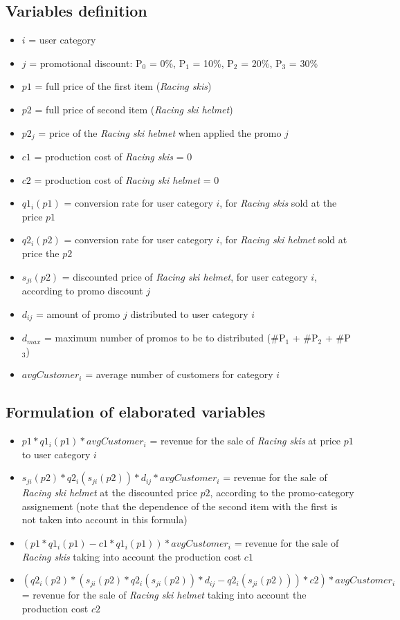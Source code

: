\subsection*{Variables definition}
\begin{itemize}
\item $i$ = user category 
\item $j$ = promotional discount: P$_0$ = 0\%, P$_1$ = 10\%, P$_2$ = 20\%, P$_3$ = 30\%
\item $p1$ = full price of the first item (\textit{Racing skis}) 
\item $p2$ = full price of second item (\textit{Racing ski helmet})
\item $p2_j$ = price of the \textit{Racing ski helmet} when applied the promo $j$
\item $c1$ = production cost of \textit{Racing skis} = 0
\item $c2$ = production cost of \textit{Racing ski helmet} = 0
\item $q1_i(p1)$ = conversion rate for user category $i$, for \textit{Racing skis} sold at the price $p1$
\item $q2_i(p2)$ = conversion rate for user category $i$, for \textit{Racing ski helmet} sold at price the $p2$
\item $s_{ji}(p2)$ = discounted price of \textit{Racing ski helmet}, for user category $i$, according to promo discount $j$
\item $d_{ij}$ = amount of promo $j$ distributed to user category $i$
\item $d_{max}$ = maximum number of promos to be to distributed (\#P$_1$ + \#P$_2$ + \#P$_3$)
\item $avgCustomer_i$ = average number of customers for category $i$
\end{itemize}


\subsection*{Formulation of elaborated variables}
\begin{itemize}
\item $p1*q1_i(p1)*avgCustomer_i$ = revenue for the sale of \textit{Racing skis} at price $p1$ to user category $i$ 
\item $s_{ji}(p2)*q2_i(s_{ji}(p2))*d_{ij}*avgCustomer_i$  = revenue for the sale of \textit{Racing ski helmet} at the discounted price $p2$, according to the promo-category assignement (note that the dependence of the second item with the first is not taken into account in this formula)
\item $(p1*q1_i(p1)-c1*q1_i(p1))*avgCustomer_i$ = revenue for the sale of \textit{Racing skis} taking into account the production cost $c1$
\item $(q2_i(p2)*(s_{ji}(p2)*q2_i(s_{ji}(p2))*d_{ij}-q2_i(s_{ji}(p2)))*c2)*avgCustomer_i$ = revenue for the sale of \textit{Racing ski helmet} taking into account the production cost $c2$
\end{itemize}

